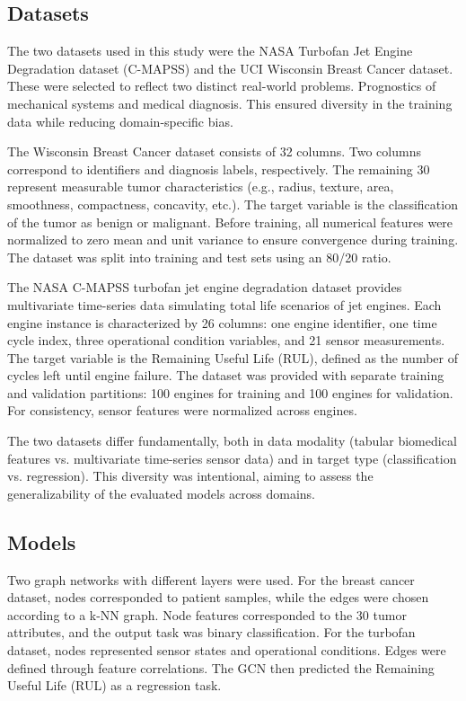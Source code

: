 \documentclass[12pt]{article}
\begin{document}
\subsection{Datasets}
The two datasets used in this study were the NASA Turbofan Jet Engine Degradation dataset (C-MAPSS) and the UCI Wisconsin Breast Cancer dataset. These were selected to reflect two distinct real-world problems. Prognostics of mechanical systems and medical diagnosis. This ensured diversity in the training data while reducing domain-specific bias.

The Wisconsin Breast Cancer dataset consists of 32 columns. Two columns correspond to identifiers and diagnosis labels, respectively.
The remaining 30 represent measurable tumor characteristics (e.g., radius, texture, area, smoothness, compactness, concavity, etc.). The target variable is the classification of the tumor as benign or malignant. Before training, all numerical features were normalized to zero mean and unit variance to ensure convergence during training. The dataset was split into training and test sets using an 80/20 ratio.


The NASA C-MAPSS turbofan jet engine degradation dataset provides multivariate time-series data simulating total life scenarios of jet engines. Each engine instance is characterized by 26 columns: one engine identifier, one time cycle index, three operational condition variables, and 21 sensor measurements. The target variable is the Remaining Useful Life (RUL), defined as the number of cycles left until engine failure.
The dataset was provided with separate training and validation partitions: 100 engines for training and 100 engines for validation. For consistency, sensor features were normalized across engines.


The two datasets differ fundamentally, both in data modality (tabular biomedical features vs. multivariate time-series sensor data) and in target type (classification vs. regression). This diversity was intentional, aiming to assess the generalizability of the evaluated models across domains.


\subsection{Models}
Two graph networks with different layers were used.
For the breast cancer dataset, nodes corresponded to patient samples, while the edges were chosen according to a k-NN graph. Node features corresponded to the 30 tumor attributes, and the output task was binary classification.
For the turbofan dataset, nodes represented sensor states and operational conditions. Edges were defined through feature correlations. The GCN then predicted the Remaining Useful Life (RUL)
as a regression task.
\end{document}
